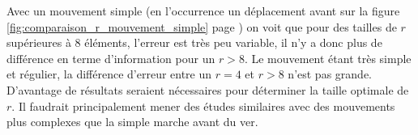 Avec un mouvement simple (en l'occurrence un déplacement avant sur la figure
\ref{fig:comparaison_r_mouvement_simple} page
\pageref{fig:comparaison_r_mouvement_simple}) on voit que pour des tailles de $r$
supérieures à 8 éléments, l'erreur est très peu variable, il n'y a donc plus de différence
en terme d'information pour un $r > 8$. Le mouvement étant très simple et régulier,
la différence d'erreur entre un $r = 4$ et $r > 8$ n'est pas grande. 
D'avantage de résultats seraient nécessaires pour déterminer la taille optimale de $r$. 
Il faudrait principalement mener des études similaires avec des mouvements plus complexes
que la simple marche avant du ver.



%




